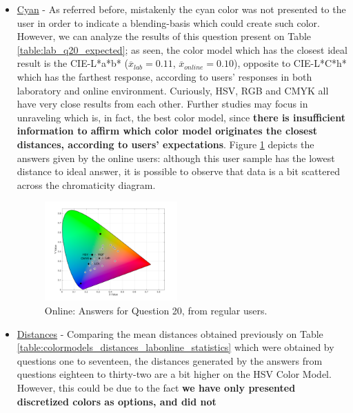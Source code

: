\begin{itemize}
  \item \ul{Cyan} - As referred before, mistakenly the cyan color was not presented to the user in order to indicate a blending-basis which could create such color. However, we can analyze the results of
  this question present on Table \ref{table:lab_q20_expected}; as seen, the color model which has the closest ideal result is the CIE-L*a*b* ($\overline{x}_{lab} = 0.11$, $\overline{x}_{online} = 0.10$), opposite
  to CIE-L*C*h* which has the farthest response, according to users' responses in both laboratory and online environment. Curiously, HSV, RGB and CMYK all have very close results from each other. Further
  studies may focus in unraveling which is, in fact, the best color model, since \textbf{there is insufficient information to affirm which color model originates the closest distances, according to users'
  expectations}. Figure \ref{fig:onlineregular_20} depicts the answers given by the online users: although this user sample has the lowest distance to ideal answer, it is possible to observe that data is
  a bit scattered across the chromaticity diagram.
  \begin{figure}[!htbp]
    \centering
    \vspace{-15pt}
    \includegraphics[width=0.48\textwidth]{images/results/20_online_regularUsers.png}
    \caption[Online: Answers for Question 20, from regular users.]{Online: Answers for Question 20, from regular users.}
    \vspace{-15pt}
    \label{fig:onlineregular_20}
  \end{figure}
  \item \ul{Distances} - Comparing the mean distances obtained previously on Table \ref{table:colormodels_distances_labonline_statistics} which were obtained by questions one to seventeen, the distances generated
  by the answers from questions eighteen to thirty-two are a bit higher on the HSV Color Model. However, this could be due to the fact \textbf{we have only presented discretized colors as options, and did not
}
\end{itemize}
